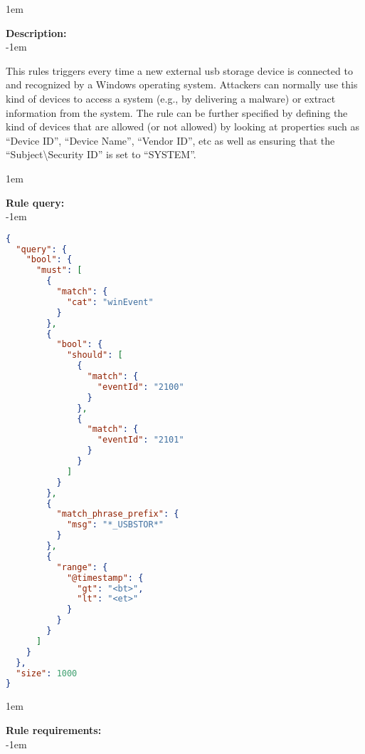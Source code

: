 \openup 1em

{\bf Description:} \\

\openup -1em
\vspace{-2em}


This rules triggers every time a new external usb storage device is connected to and recognized by a Windows operating system. Attackers can normally use this kind of devices to access a system (e.g., by delivering a malware) or extract information from the system. The rule can be further specified by defining the kind of devices that are allowed (or not allowed) by looking at properties such as ``Device ID'', ``Device Name'', ``Vendor ID'', etc as well as ensuring that the ``Subject\textbackslash Security ID'' is set to ``SYSTEM''.

\openup 1em

{\bf Rule query:} \\

\openup -1em
\vspace{-2em}

\begin{lstlisting}[language=json,firstnumber=1]
{
  "query": {
    "bool": {
      "must": [
        {
          "match": {
            "cat": "winEvent"
          }
        },
        {
          "bool": {
            "should": [
              {
                "match": {
                  "eventId": "2100"
                }
              },
              {
                "match": {
                  "eventId": "2101"
                }
              }
            ]
          }
        },
        {
          "match_phrase_prefix": {
            "msg": "*_USBSTOR*"
          }
        },
        {
          "range": {
            "@timestamp": {
              "gt": "<bt>",
              "lt": "<et>"
            }
          }
        }
      ]
    }
  },
  "size": 1000
}
\end{lstlisting}

\openup 1em

{\bf Rule requirements:} \\

\openup -1em
\vspace{-2em}

